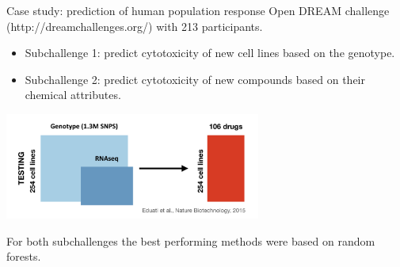 \documentclass[notes]{beamer}          %
\begin{document}
\begin{frame}{Case study: prediction of human population response}
Open DREAM challenge (http://dreamchallenges.org/) with 213 participants.
\begin{itemize}
\item Subchallenge 1: predict cytotoxicity of new cell lines based on the genotype.

\item Subchallenge 2: predict cytotoxicity of new compounds based on their chemical attributes.

\end{itemize}
\begin{center}
\includegraphics[height=3.5cm]{../figures/week_2_classification/Challenge.pdf}  
\end{center}
\vspace{-0.5cm}
For both subchallenges the best performing methods were based on random forests.

\end{frame}



%
\end{document}
